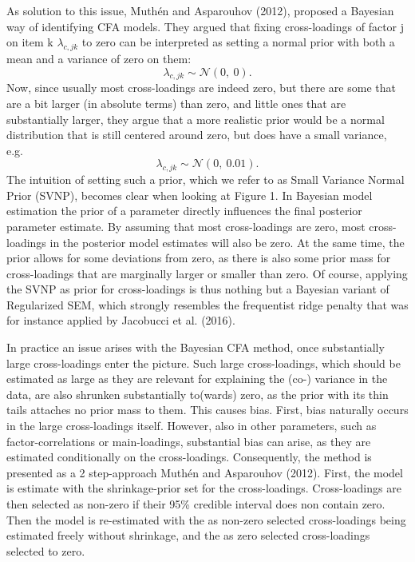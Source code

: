 \documentclass[
  man, donotrepeattitle,floatsintext]{apa6}
\begin{document}
As solution to this issue, Muthén and Asparouhov (2012), proposed a Bayesian way of identifying CFA models. They argued that fixing cross-loadings of factor j on item k \(\lambda_{c,jk}\) to zero can be interpreted as setting a normal prior with both a mean and a variance of zero on them:
\[\lambda_{c,jk}  \sim \mathcal{N}(0, \ 0).\]
Now, since usually most cross-loadings are indeed zero, but there are some that are a bit larger (in absolute terms) than zero, and little ones that are substantially larger, they argue that a more realistic prior would be a normal distribution that is still centered around zero, but does have a small variance, e.g.~
\[\lambda_{c,jk}  \sim \mathcal{N}(0, \ 0.01).\]
The intuition of setting such a prior, which we refer to as Small Variance Normal Prior (SVNP), becomes clear when looking at Figure 1. In Bayesian model estimation the prior of a parameter directly influences the final posterior parameter estimate. By assuming that most cross-loadings are zero, most cross-loadings in the posterior model estimates will also be zero. At the same time, the prior allows for some deviations from zero, as there is also some prior mass for cross-loadings that are marginally larger or smaller than zero. Of course, applying the SVNP as prior for cross-loadings is thus nothing but a Bayesian variant of Regularized SEM, which strongly resembles the frequentist ridge penalty that was for instance applied by Jacobucci et al. (2016).

In practice an issue arises with the Bayesian CFA method, once substantially large cross-loadings enter the picture. Such large cross-loadings, which should be estimated as large as they are relevant for explaining the (co-) variance in the data, are also shrunken substantially to(wards) zero, as the prior with its thin tails attaches no prior mass to them. This causes bias. First, bias naturally occurs in the large cross-loadings itself. However, also in other parameters, such as factor-correlations or main-loadings, substantial bias can arise, as they are estimated conditionally on the cross-loadings. Consequently, the method is presented as a 2 step-approach Muthén and Asparouhov (2012). First, the model is estimate with the shrinkage-prior set for the cross-loadings. Cross-loadings are then selected as non-zero if their 95\% credible interval does non contain zero. Then the model is re-estimated with the as non-zero selected cross-loadings being estimated freely without shrinkage, and the as zero selected cross-loadings selected to zero.
\end{document}
